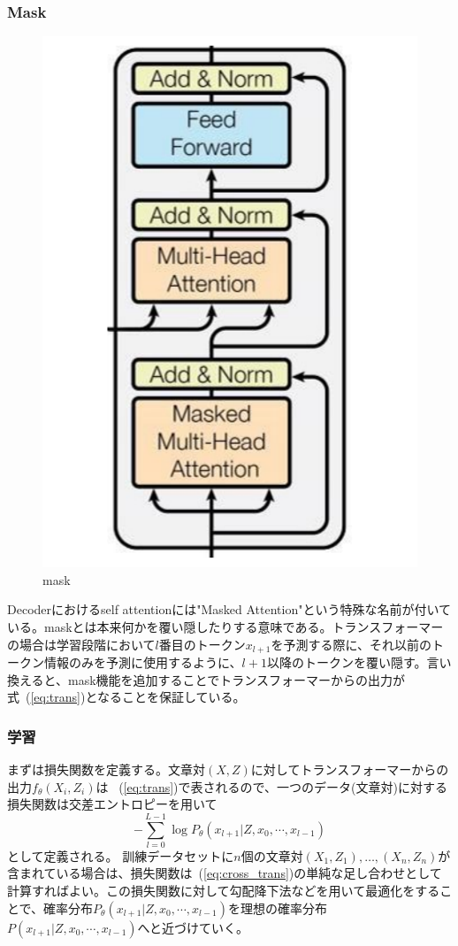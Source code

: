 \subsubsection{Mask}

\begin{figure}
  \centering
  \includegraphics[width=0.5\linewidth]{fig/decoder.pdf}
  \caption{mask}
\label{fig:mask}
\end{figure}

Decoderにおけるself attentionには"Masked Attention"という特殊な名前が付いている。maskとは本来何かを覆い隠したりする意味である。トランスフォーマーの場合は学習段階において$l$番目のトークン$x_{l+1}$を予測する際に、それ以前のトークン情報のみを予測に使用するように、$l+1$以降のトークンを覆い隠す。言い換えると、mask機能を追加することでトランスフォーマーからの出力が式~(\ref{eq:trans})となることを保証している。

\subsubsection{学習}

まずは損失関数を定義する。文章対$(X, Z)$に対してトランスフォーマーからの出力$f_\theta(X_i, Z_i)$は
~(\ref{eq:trans})で表されるので、一つのデータ(文章対)に対する損失関数は交差エントロピーを用いて
\begin{equation}
  \label{eq:cross_trans}
  - \sum_{l=0}^{L-1} \log P_\theta(x_{l+1} | Z, x_0, \cdots, x_{l-1} )
\end{equation}
として定義される。
  \label{eq:cross_trans}
訓練データセットに$n$個の文章対$(X_1, Z_1),\ldots, (X_n, Z_n)$が含まれている場合は、損失関数は~(\ref{eq:cross_trans})の単純な足し合わせとして計算すればよい。この損失関数に対して勾配降下法などを用いて最適化をすることで、確率分布$P_\theta(x_{l+1} | Z, x_0, \cdots, x_{l-1} )$を理想の確率分布$P(x_{l+1} | Z, x_0, \cdots, x_{l-1} )$へと近づけていく。 

